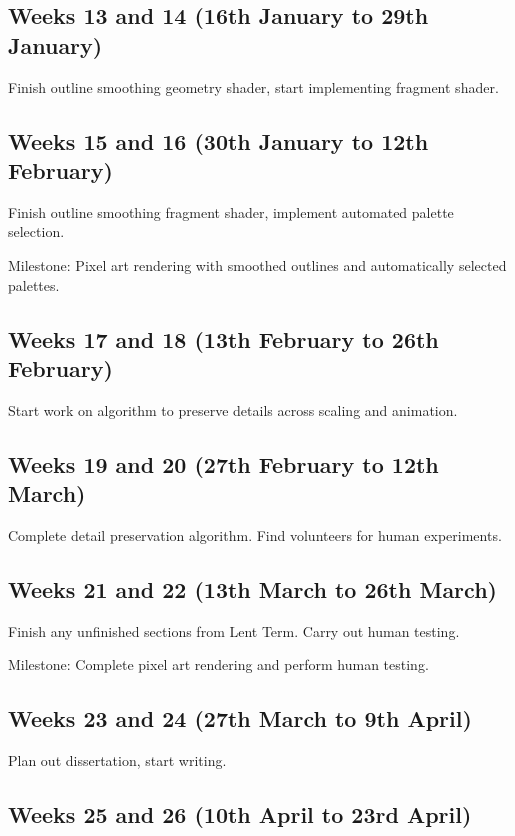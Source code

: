 \documentclass[12pt,twoside,notitlepage]{report}
\begin{document}
\subsection*{Weeks 13 and 14 (16th January to 29th January)}

Finish outline smoothing geometry shader, start implementing fragment shader.

\subsection*{Weeks 15 and 16 (30th January to 12th February)}

Finish outline smoothing fragment shader, implement automated palette selection.

Milestone: Pixel art rendering with smoothed outlines and automatically selected palettes.

\subsection*{Weeks 17 and 18 (13th February to 26th February)}

Start work on algorithm to preserve details across scaling and animation.

\subsection*{Weeks 19 and 20 (27th February to 12th March)}

Complete detail preservation algorithm. Find volunteers for human experiments.

\subsection*{Weeks 21 and 22 (13th March to 26th March)}

Finish any unfinished sections from Lent Term. Carry out human testing.

Milestone: Complete pixel art rendering and perform human testing.

\subsection*{Weeks 23 and 24 (27th March to 9th April)}

Plan out dissertation, start writing.

\subsection*{Weeks 25 and 26 (10th April to 23rd April)}
\end{document}
